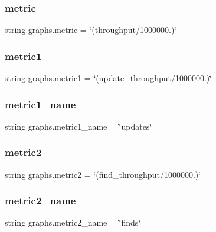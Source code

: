 \subsubsection{\texorpdfstring{metric}{metric}}
{\footnotesize\ttfamily string graphs.\+metric = \char`\"{}(throughput/1000000.)\char`\"{}}

\mbox{\label{namespacegraphs_a68d13065728a87168cb8c19ff1bd32ce}} 
\subsubsection{\texorpdfstring{metric1}{metric1}}
{\footnotesize\ttfamily string graphs.\+metric1 = \char`\"{}(update\+\_\+throughput/1000000.)\char`\"{}}

\mbox{\label{namespacegraphs_a9a5cdf32dfaa1c8b350140ace4b5bb02}} 
\subsubsection{\texorpdfstring{metric1\+\_\+name}{metric1\_name}}
{\footnotesize\ttfamily string graphs.\+metric1\+\_\+name = \char`\"{}updates\char`\"{}}

\mbox{\label{namespacegraphs_a8ef3eba033178469dc23898911cf8254}} 
\subsubsection{\texorpdfstring{metric2}{metric2}}
{\footnotesize\ttfamily string graphs.\+metric2 = \char`\"{}(find\+\_\+throughput/1000000.)\char`\"{}}

\mbox{\label{namespacegraphs_a580a5506835da9113d05e523b5dd0951}} 
\subsubsection{\texorpdfstring{metric2\+\_\+name}{metric2\_name}}
{\footnotesize\ttfamily string graphs.\+metric2\+\_\+name = \char`\"{}finds\char`\"{}}


